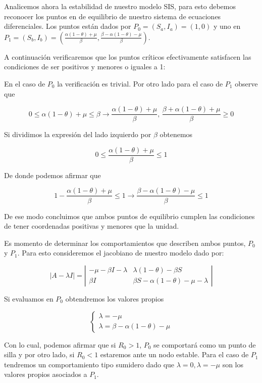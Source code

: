 Analicemos ahora la estabilidad de nuestro modelo SIS, para esto debemos reconocer los puntos en de equilibrio de nuestro sistema de ecuaciones diferenciales. Los puntos están dados por $P_0=(S_a,I_a)=(1,0)$ y uno en $P_1=(S_b,I_b)=\left(\frac{\alpha(1-\theta)+\mu}{\beta},\frac{\beta-\alpha(1-\theta)-\mu}{\beta}\right)$.

A continuación verificaremos que los puntos críticos efectivamente satisfacen las condiciones de ser positivos y menores o iguales a 1:

En el caso de $P_0$ la verificación es trivial. Por otro lado para el caso de $P_1$ observe que 

$$0\leq\alpha(1-\theta)+\mu\leq\beta \longrightarrow \frac{\alpha(1-\theta)+\mu}{\beta}\text{, }\frac{\beta+\alpha(1-\theta)+\mu}{\beta}\geq0$$

Si dividimos la expresión del lado izquierdo por $\beta$ obtenemos

$$0\leq \frac{\alpha(1-\theta)+\mu}{\beta}\leq1$$

De donde podemos afirmar que 

$$1-\frac{\alpha(1-\theta)+\mu}{\beta}\leq1 \longrightarrow \frac{\beta-\alpha(1-\theta)-\mu}{\beta}\leq1$$

De ese modo concluimos que ambos puntos de equilibrio cumplen las condiciones de tener coordenadas positivas y menores que la unidad.

Es momento de determinar los comportamientos que describen ambos puntos, $P_0$ y $P_1$. Para esto consideremos el jacobiano de nuestro modelo dado por:

$$|A-\lambda I|=
\left|\begin{array}{cc}
-\mu-\beta I-\lambda & \lambda(1-\theta)-\beta S \\
\beta I & \beta S-\alpha(1-\theta)-\mu-\lambda
\end{array}\right|$$

Si evaluamos en $P_0$ obtendremos los valores propios

$$\left\{\begin{array}{l}\lambda=-\mu \\
\lambda=\beta-\alpha(1-\theta)-\mu\end{array}\right.$$

Con lo cual, podemos afirmar que si $R_0>1$, $P_0$ se comportará como un punto de silla y por otro lado, si $R_0<1$ estaremos ante un nodo estable. Para el caso de $P_1$ tendremos un comportamiento tipo sumidero dado que $\lambda=0,\lambda=-\mu$ son los valores propios asociados a $P_1$.

